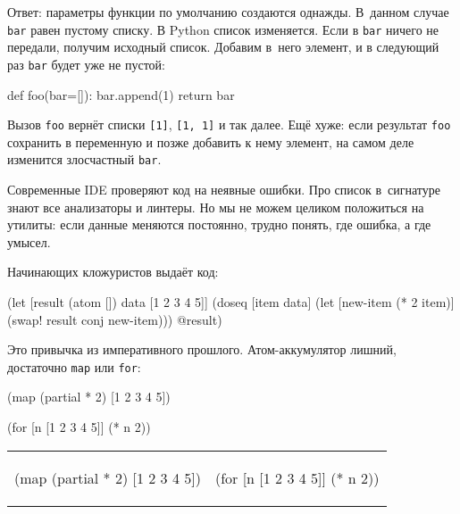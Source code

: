Ответ: параметры функции по умолчанию создаются однажды. В~данном случае
\verb|bar| равен пустому списку. В Python список изменяется. Если в
\verb|bar| ничего не передали, получим исходный список. Добавим в~него
элемент, и в следующий раз \verb|bar| будет уже не пустой:

\begin{english}
  \begin{python}
def foo(bar=[]):
    bar.append(1)
    return bar
  \end{python}
\end{english}

Вызов \verb|foo| вернёт списки \verb|[1]|, \verb|[1, 1]| и так
далее. Ещё хуже: если результат \verb|foo| сохранить в переменную и позже
добавить к нему элемент, на самом деле изменится злосчастный \verb|bar|.

Современные IDE проверяют код на неявные ошибки. Про список в~сигнатуре знают
все анализаторы и линтеры. Но мы не можем целиком положиться на утилиты: если
данные меняются постоянно, трудно понять, где ошибка, а где умысел.

Начинающих кложуристов выдаёт код:

\begin{english}
  \begin{clojure}
(let [result (atom [])
      data [1 2 3 4 5]]
  (doseq [item data]
    (let [new-item (* 2 item)]
      (swap! result conj new-item)))
  @result)
  \end{clojure}
\end{english}


\noindent
Это привычка из императивного прошлого. Атом-аккумулятор лишний, достаточно
\verb|map| или \verb|for|:

\ifx\DEVICETYPE\MOBILE

\begin{english}
  \begin{clojure}
(map (partial * 2)
     [1 2 3 4 5])
  \end{clojure}

\splitter

  \begin{clojure}
(for [n [1 2 3 4 5]]
  (* n 2))
  \end{clojure}
\end{english}

\else

\begin{english}

\noindent
\begin{tabular}{ @{}p{5cm} @{}p{5cm} }

  \begin{clojure}
(map (partial * 2)
     [1 2 3 4 5])
  \end{clojure}

&

  \begin{clojure}
(for [n [1 2 3 4 5]]
  (* n 2))
  \end{clojure}

\end{tabular}

\end{english}

